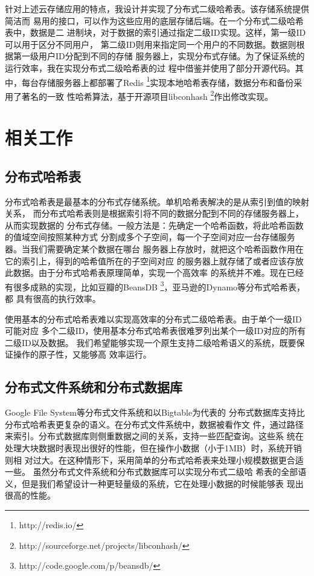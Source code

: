 针对上述云存储应用的特点，我设计并实现了分布式二级哈希表。该存储系统提供简洁而
易用的接口，可以作为这些应用的底层存储后端。在一个分布式二级哈希表中，数据是二
进制块，对于数据的索引通过指定二级ID实现。这样，第一级ID可以用于区分不同用户，
第二级ID则用来指定同一个用户的不同数据。数据则根据第一级用户ID分配到不同的存储
服务器上，实现分布式存储。为了保证系统的运行效率，我在实现分布式二级哈希表的过
程中借鉴并使用了部分开源代码。其中，每台存储服务器上都部署了Redis
\footnote{http://redis.io/}实现本地哈希表存储，数据分布和备份采用了著名的一致
性哈希算法\cite{karger1997consistent}，基于开源项目libconhash
\footnote{http://sourceforge.net/projects/libconhash/}作出修改实现。

\section{相关工作}

\subsection{分布式哈希表}
分布式哈希表是最基本的分布式存储系统。单机哈希表解决的是从索引到值的映射关系，
而分布式哈希表则是根据索引将不同的数据分配到不同的存储服务器上，从而实现数据的
分布式存储。一般方法是：先确定一个哈希函数，将此哈希函数的值域空间按照某种方式
分割成多个子空间，每一个子空间对应一台存储服务器。当我们需要确定某个数据在哪台
服务器上存放时，就把这个哈希函数作用在它的索引上，得到的哈希值所在的子空间对应
的服务器上就存储了或者应该存放此数据。由于分布式哈希表原理简单，实现一个高效率
的系统并不难。现在已经有很多成熟的实现，比如豆瓣的BeansDB
\footnote{http://code.google.com/p/beansdb/}，亚马逊的Dynamo等分布式哈希表，都
具有很高的执行效率。

使用基本的分布式哈希表难以实现高效率的分布式二级哈希表。由于单个一级ID可能对应
多个二级ID，使用基本分布式哈希表很难罗列出某个一级ID对应的所有二级ID以及数据。
我们希望能够实现一个原生支持二级哈希语义的系统，既要保证操作的原子性，又能够高
效率运行。

\subsection{分布式文件系统和分布式数据库}
Google File System等分布式文件系统和以Bigtable\cite{chang2008bigtable}为代表的
分布式数据库支持比分布式哈希表更复杂的语义。在分布式文件系统中，数据被看作文
件，通过路径来索引。分布式数据库则侧重数据之间的关系，支持一些匹配查询。这些系
统在处理大块数据时表现出很好的性能，但在操作小数据（小于1MB）时，系统开销则相
对过大。在这种情形下，采用简单的分布式哈希表来处理小规模数据更合适一些。
\cite{hastorun2007dynamo}虽然分布式文件系统和分布式数据库可以实现分布式二级哈
希表的全部语义，但是我们希望设计一种更轻量级的系统，它在处理小数据的时候能够表
现出很高的性能。
